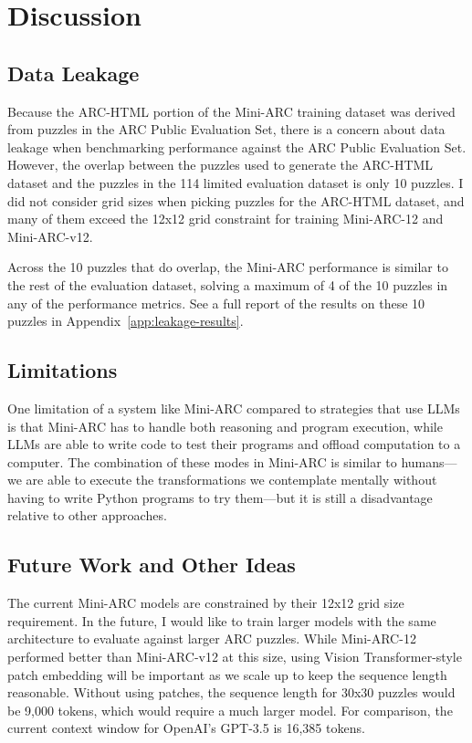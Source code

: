\documentclass[10pt,twocolumn]{article}
\begin{document}
\section{Discussion}
\subsection{Data Leakage}
Because the ARC-HTML portion of the Mini-ARC training dataset was
derived from puzzles in the ARC Public Evaluation Set, there is a
concern about data leakage when benchmarking
performance against the ARC Public Evaluation Set. However, the
overlap between the puzzles used to generate the ARC-HTML dataset and
the puzzles in the 114 limited evaluation dataset is only 10 puzzles.
I did not consider grid sizes when picking puzzles for the
ARC-HTML dataset, and many of them exceed the 12x12 grid constraint
for training Mini-ARC-12 and Mini-ARC-v12.

Across the 10 puzzles that do overlap, the Mini-ARC performance is
similar to the rest
of the evaluation dataset, solving a maximum of 4 of the 10 puzzles
in any of the performance metrics. See a full report of the results
on these 10 puzzles in Appendix~\ref{app:leakage-results}.

\subsection{Limitations}
One limitation of a system like Mini-ARC compared to
strategies that use LLMs is that Mini-ARC has to handle both
reasoning and program execution, while LLMs are able to write code to
test their programs and offload computation to a computer. The
combination of these modes in Mini-ARC is similar to
humans—we are able to execute the transformations we contemplate
mentally without having to write Python programs to try them—but it
is still a disadvantage relative to other approaches.

\subsection{Future Work and Other Ideas}
The current Mini-ARC models are constrained by their 12x12 grid size
requirement. In the future, I would like to train larger models with
the same architecture to evaluate against larger ARC puzzles. While
Mini-ARC-12 performed better than Mini-ARC-v12 at this size, using
Vision Transformer-style patch embedding will be important as we
scale up to keep the sequence length reasonable. Without using
patches, the sequence length for 30x30 puzzles would be 9,000 tokens,
which would require a much larger model.
For comparison, the current context window for OpenAI's GPT-3.5 is
16,385 tokens.
\end{document}
